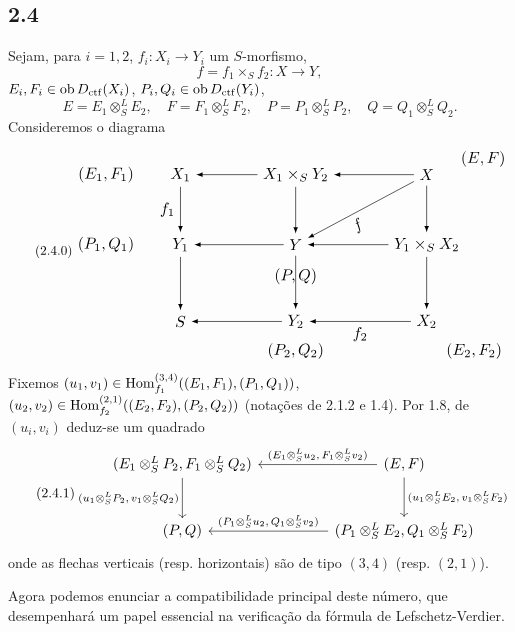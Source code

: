 \subsection*{2.4}
Sejam, para $i=1,2$, $f_i:X_i\to Y_i$ um $S$-morfismo,
\[
f=f_1\times_S f_2:X\to Y,
\]
$E_i,F_i\in\operatorname{ob} D_{\mathrm{ctf}}(X_i)$, $P_i,Q_i\in\operatorname{ob} D_{\mathrm{ctf}}(Y_i)$,
\[
E=E_1\otimes^{L}_{S}E_2,
\quad F=F_1\otimes^{L}_{S}F_2,
\quad P=P_1\otimes^{L}_{S}P_2,
\quad Q=Q_1\otimes^{L}_{S}Q_2.
\]
Consideremos o diagrama
\begin{equation}\tag{2.4.0}
\resizebox{0.96\textwidth}{!}{%
\begin{tikzpicture}[>=latex,baseline=(current bounding box.center)]
\node (EF1) at (-5.2,2.0) {$(E_1,F_1)$};
\node (X1)  at (-3.55,2.0) {$X_1$};
\node (X1Y2) at (-1.0,2.0) {$X_1\times_S Y_2$};
\node (X) at (1.9,2.0) {$X$};
\node (EF) at (3.15,2.35) {$(E,F)$};
\node (PQ1) at (-5.2,0.45) {$(P_1,Q_1)$};
\node (Y1) at (-3.55,0.45) {$Y_1$};
\node (Y) at (-1.0,0.45) {$Y$};
\node (Y1X2) at (1.9,0.45) {$Y_1\times_S X_2$};
\node (S) at (-3.55,-1.25) {$S$};
\node (Y2) at (-1.0,-1.25) {$Y_2$};
\node (X2) at (1.9,-1.25) {$X_2$};
\node (PQ) at (-1.0,-0.25) {$(P,Q)$};
\node (PQ2) at (-1.0,-1.9) {$(P_2,Q_2)$};
\node (EF2) at (2.95,-1.9) {$(E_2,F_2)$};
\draw[->] (X1Y2) -- (X1);
\draw[->] (X) -- (X1Y2);
\draw[->] (X1) -- node[left] {$f_1$} (Y1);
\draw[->] (X1Y2) -- (Y);
\draw[->] (X) -- (Y1X2);
\draw[->] (X) -- node[below,sloped,pos=.58] {$f$} (Y);
\draw[->] (Y) -- (Y1);
\draw[->] (Y1X2) -- (Y);
\draw[->] (Y1) -- (S);
\draw[->] (Y) -- (Y2);
\draw[->] (Y1X2) -- (X2);
\draw[->] (Y2) -- (S);
\draw[->] (X2) -- node[below] {$f_2$} (Y2);
\end{tikzpicture}}
\end{equation}
Fixemos $(u_1,v_1)\in\operatorname{Hom}_{f_1}^{(3,4)}((E_1,F_1),(P_1,Q_1))$, $(u_2,v_2)\in\operatorname{Hom}_{f_2}^{(2,1)}((E_2,F_2),(P_2,Q_2))$ (notações de 2.1.2 e 1.4). Por 1.8, de $(u_i,v_i)$ deduz-se um quadrado
\begin{equation}\tag{2.4.1}
\resizebox{0.92\textwidth}{!}{%
\begin{tikzcd}[ampersand replacement=\&,column sep=huge,row sep=large]
(E_1\otimes^L_S P_2,F_1\otimes^L_S Q_2)
  \arrow[d,"{(u_1\otimes^L_S P_2,\,v_1\otimes^L_S Q_2)}"']
  \& (E,F) \arrow[l,"{(E_1\otimes^L_S u_2,\,F_1\otimes^L_S v_2)}"'] \arrow[d,"{(u_1\otimes^L_S E_2,\,v_1\otimes^L_S F_2)}"] \\
(P,Q)
  \& (P_1\otimes^L_S E_2,Q_1\otimes^L_S F_2) \arrow[l,"{(P_1\otimes^L_S u_2,\,Q_1\otimes^L_S v_2)}"']
\end{tikzcd}}
\end{equation}
onde as flechas verticais (resp. horizontais) são de tipo $(3,4)$ (resp. $(2,1)$).

Agora podemos enunciar a compatibilidade principal deste número, que desempenhará um papel essencial na verificação da fórmula de Lefschetz-Verdier.
